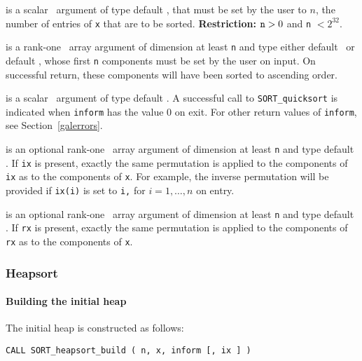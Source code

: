 \documentclass{galahad}
\newcommand{\packagename}{SORT}
\begin{document}
\begin{description}
 is a scalar \intentin\ argument of type default
\integer, that must be set by the user to $n$, the 
number of entries of {\tt x} that are to be sorted. 
{\bf Restriction:} ${\tt n} > 0$  and {\tt n} $< 2^{32}$.  

 is a rank-one \intentinout\ array argument of
dimension at least {\tt n} and type either default
\integer\ or default \realdp, whose first {\tt n} components must be set by
the user on input. On successful return, these components will have 
been sorted to ascending order.
 
 is a scalar \intentout\ argument of type default \integer.
A successful call to {\tt \packagename\_quicksort}
is indicated when {\tt inform} has the value 0 on exit.
For other return values of {\tt inform}, see Section~\ref{galerrors}.

 is an optional rank-one \intentinout\ array argument of
dimension at least {\tt n} and type default \integer.
If {\tt ix} is present, exactly the same permutation is applied to the 
components of {\tt ix} as to the components of {\tt x}. 
For example, the inverse permutation will be provided if {\tt ix(i)} is set to
{\tt i,} for $i = 1, \ldots, n$ on entry. 
 
 is an optional rank-one \intentinout\ array argument of
dimension at least {\tt n} and type default \realdp.
If {\tt rx} is present, exactly the same permutation is applied to the 
components of {\tt rx} as to the components of {\tt x}. 
 
\end{description}


\subsubsection{Heapsort}

\paragraph{Building the initial heap}
The initial heap is constructed as follows:
\vspace*{1mm}

\hspace{8mm}
{\tt CALL \packagename\_heapsort\_build ( n, x, inform [, ix ] )}
\end{document}
